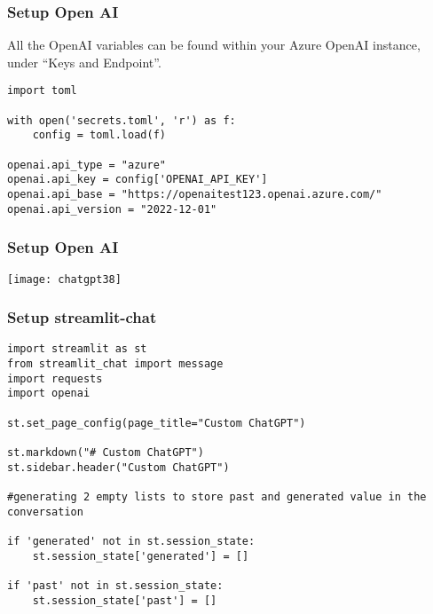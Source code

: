 \begin{frame}[fragile]\frametitle{ Setup Open AI}

All the OpenAI variables can be found within your Azure OpenAI instance, under ``Keys and Endpoint''.

\begin{lstlisting}
import toml

with open('secrets.toml', 'r') as f:
    config = toml.load(f)

openai.api_type = "azure"
openai.api_key = config['OPENAI_API_KEY']
openai.api_base = "https://openaitest123.openai.azure.com/"
openai.api_version = "2022-12-01"

\end{lstlisting}	 


\end{frame}

\begin{frame}[fragile]\frametitle{ Setup Open AI}

\begin{center}
\texttt{[image: chatgpt38]}
\end{center}

\end{frame}

\begin{frame}[fragile]\frametitle{ Setup streamlit-chat }

\begin{lstlisting}
import streamlit as st
from streamlit_chat import message
import requests
import openai

st.set_page_config(page_title="Custom ChatGPT")

st.markdown("# Custom ChatGPT")
st.sidebar.header("Custom ChatGPT")

#generating 2 empty lists to store past and generated value in the conversation

if 'generated' not in st.session_state:
    st.session_state['generated'] = []

if 'past' not in st.session_state:
    st.session_state['past'] = []

\end{lstlisting}	 

\end{frame}

